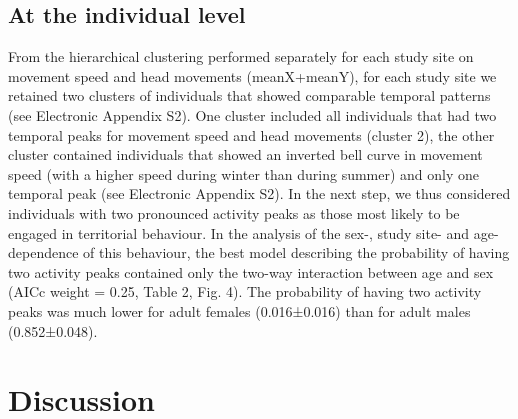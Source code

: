 \documentclass[a4paper,11pt]{article}
\begin{document}
\subsection{At the individual level}
From the hierarchical clustering performed separately for each study
site on movement speed and head movements (meanX+meanY), for each
study site we retained two clusters of individuals that showed
comparable temporal patterns (see Electronic Appendix S2). One cluster
included all individuals that had two temporal peaks for movement
speed and head movements (cluster 2), the other cluster contained
individuals that showed an inverted bell curve in movement speed (with
a higher speed during winter than during summer) and only one temporal
peak (see Electronic Appendix S2). In the next step, we thus
considered individuals with two pronounced activity peaks as those
most likely to be engaged in territorial behaviour. In the analysis of
the sex-, study site- and age- dependence of this behaviour, the best
model describing the probability of having two activity peaks
contained only the two-way interaction between age and sex (AICc
weight = 0.25, Table 2, Fig. 4). The probability of having two
activity peaks was much lower for adult females (0.016±0.016) than for
adult males (0.852±0.048).

\section{Discussion}


\end{document}
